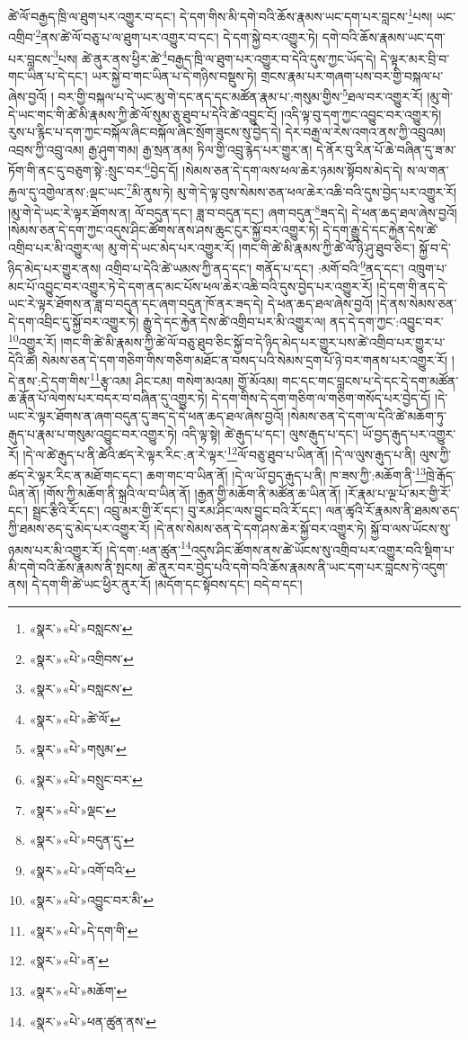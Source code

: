 ཚེ་ལོ་བརྒྱད་ཁྲི་ལ་ཐུག་པར་འགྱུར་བ་དང་། དེ་དག་གིས་མི་དགེ་བའི་ཆོས་རྣམས་ཡང་དག་པར་བླངས་\footnote{«སྣར་»«པེ་»བསླངས་}པས། ཡང་འགྲིབ་\footnote{«སྣར་»«པེ་»འགྲིབས་}ནས་ཚེ་ལོ་བཅུ་པ་ལ་ཐུག་པར་འགྱུར་བ་དང་། དེ་དག་སྐྱེ་བར་འགྱུར་ཏེ། དགེ་བའི་ཆོས་རྣམས་ཡང་དག་པར་བླངས་\footnote{«སྣར་»«པེ་»བསླངས་}པས། ཚེ་ནུར་ནས་ཕྱིར་ཚེ་\footnote{«སྣར་»«པེ་»ཚེ་ལོ་}བརྒྱད་ཁྲི་ལ་ཐུག་པར་འགྱུར་བ་དེའི་དུས་ཀྱང་ཡོད་དེ། དེ་ལྟར་མར་བྲི་བ་གང་ཡིན་པ་དེ་དང་། ཡར་སྐྱེ་བ་གང་ཡིན་པ་དེ་གཉིས་བསྡུས་ཏེ། གྲངས་རྣམ་པར་གཞག་པས་བར་གྱི་བསྐལ་པ་ཞེས་བྱའོ། །
བར་གྱི་བསྐལ་པ་དེ་ཡང་མུ་གེ་དང་ནད་དང་མཚོན་རྣམ་པ་:གསུམ་གྱིས་\footnote{«སྣར་»«པེ་»གསུམ་}ཐལ་བར་འགྱུར་རོ། །མུ་གེ་དེ་ཡང་གང་གི་ཚེ་མི་རྣམས་ཀྱི་ཚེ་ལོ་སུམ་ཅུ་ཐུབ་པ་དེའི་ཚེ་འབྱུང་ངོ། །འདི་ལྟ་བུ་དག་ཀྱང་འབྱུང་བར་འགྱུར་ཏེ། རུས་པ་རྙིང་པ་དག་ཀྱང་བསྐོལ་ཞིང་བསྐོལ་ཞིང་སྲོག་ཟུངས་སུ་བྱེད་དེ། དེར་བརྒྱ་ལ་རེས་འགའ་ནས་ཀྱི་འབྲུའམ། འབྲས་ཀྱི་འབྲུ་འམ། རྒྱ་ཤུག་གམ། རྒྱ་སྲན་ནམ། ཏིལ་གྱི་འབྲུ་རྙེད་པར་གྱུར་ན། དེ་ནོར་བུ་རིན་པོ་ཆེ་བཞིན་དུ་ཟ་མ་ཏོག་གི་ནང་དུ་བཅུག་སྟེ་:སྲུང་བར་\footnote{«སྣར་»«པེ་»བསྲུང་བར་}བྱེད་དོ། །སེམས་ཅན་དེ་དག་ལས་ཕལ་ཆེར་ཉམས་སྟོབས་མེད་དེ། ས་ལ་གན་རྐྱལ་དུ་འགྱེལ་ནས་:ལྡང་ཡང་\footnote{«སྣར་»«པེ་»ལྡང་}མི་ནུས་ཏེ། མུ་གེ་དེ་ལྟ་བུས་སེམས་ཅན་ཕལ་ཆེར་འཆི་བའི་དུས་བྱེད་པར་འགྱུར་རོ། །མུ་གེ་དེ་ཡང་རེ་ལྟར་ཐོགས་ན། ལོ་བདུན་དང་། ཟླ་བ་བདུན་དང་། ཞག་བདུན་\footnote{«སྣར་»«པེ་»བདུན་དུ་}ཟད་དེ། དེ་ཕན་ཆད་ཐལ་ཞེས་བྱའོ། །སེམས་ཅན་དེ་དག་ཀྱང་འདུས་ཤིང་ཚོགས་ནས་ཤས་ཆུང་ངུར་སྐྱོ་བར་འགྱུར་ཏེ། དེ་དག་རྒྱུ་དེ་དང་རྐྱེན་དེས་ཚེ་འགྲིབ་པར་མི་འགྱུར་ལ། མུ་གེ་དེ་ཡང་མེད་པར་འགྱུར་རོ། །གང་གི་ཚེ་མི་རྣམས་ཀྱི་ཚེ་ལོ་ཉི་ཤུ་ཐུབ་ཅིང་། སྐྱོ་བ་དེ་ཉིད་མེད་པར་གྱུར་ནས། འགྲིབ་པ་དེའི་ཚེ་ཡམས་ཀྱི་ནད་དང་། གནོད་པ་དང་། :མགོ་བའི་\footnote{«སྣར་»«པེ་»འགོ་བའི་}ནད་དང་། འཁྲུག་པ་མང་པོ་འབྱུང་བར་འགྱུར་ཏེ་དེ་དག་ནད་མང་པོས་ཕལ་ཆེར་འཆི་བའི་དུས་བྱེད་པར་འགྱུར་རོ། །དེ་དག་གི་ནད་དེ་ཡང་རེ་ལྟར་ཐོགས་ན་ཟླ་བ་བདུན་དང་ཞག་བདུན་ཁོ་ནར་ཟད་དེ། དེ་ཕན་ཆད་ཐལ་ཞེས་བྱའོ། །དེ་ནས་སེམས་ཅན་དེ་དག་འབྲིང་དུ་སྐྱོ་བར་འགྱུར་ཏེ། རྒྱུ་དེ་དང་རྐྱེན་དེས་ཚེ་འགྲིབ་པར་མི་འགྱུར་ལ། ནད་དེ་དག་ཀྱང་:འབྱུང་བར་\footnote{«སྣར་»«པེ་»འབྱུང་བར་མི་}འགྱུར་རོ། །གང་གི་ཚེ་མི་རྣམས་ཀྱི་ཚེ་ལོ་བཅུ་ཐུབ་ཅིང་སྐྱོ་བ་དེ་ཉིད་མེད་པར་གྱུར་པས་ཚེ་འགྲིབ་པར་གྱུར་པ་དེའི་ཚེ། སེམས་ཅན་དེ་དག་གཅིག་གིས་གཅིག་མཐོང་ན་བསད་པའི་སེམས་དྲག་པོ་ཉེ་བར་གནས་པར་འགྱུར་རོ། །དེ་ནས་:དེ་དག་གིས་\footnote{«སྣར་»«པེ་»དེ་དག་གི་}རྩྭ་འམ། ཤིང་ངམ། གསེག་མའམ། གྱོ་མོའམ། གང་དང་གང་བླངས་པ་དེ་དང་དེ་དག་མཚོན་ཆ་རྣོན་པོ་ལེགས་པར་བདར་བ་བཞིན་དུ་འགྱུར་ཏེ། དེ་དག་གིས་དེ་དག་གཅིག་ལ་གཅིག་གསོད་པར་བྱེད་དོ། །དེ་ཡང་རེ་ལྟར་ཐོགས་ན་ཞག་བདུན་དུ་ཟད་དེ་དེ་ཕན་ཆད་ཐལ་ཞེས་བྱའོ། །སེམས་ཅན་དེ་དག་ལ་དེའི་ཚེ་མཆོག་ཏུ་རྒུད་པ་རྣམ་པ་གསུམ་འབྱུང་བར་འགྱུར་ཏེ། འདི་ལྟ་སྟེ། ཚེ་རྒུད་པ་དང་། ལུས་རྒུད་པ་དང་། ཡོ་བྱད་རྒུད་པར་འགྱུར་རོ། །དེ་ལ་ཚེ་རྒུད་པ་ནི་ཚེའི་ཚད་རེ་ལྟར་རིང་:ན་རེ་ལྟར་\footnote{«སྣར་»«པེ་»ན་}ལོ་བཅུ་ཐུབ་པ་ཡིན་ནོ། །དེ་ལ་ལུས་རྒུད་པ་ནི། ལུས་ཀྱི་ཚད་རེ་ལྟར་རིང་ན་མཐོ་གང་དང་། ཆག་གང་བ་ཡིན་ནོ། །དེ་ལ་ཡོ་བྱད་རྒུད་པ་ནི། ཁ་ཟས་ཀྱི་:མཆོག་ནི་\footnote{«སྣར་»«པེ་»མཆོག་}ཁྲེ་རྒོད་ཡིན་ནོ། །གོས་ཀྱི་མཆོག་ནི་སྐྲའི་ལ་བ་ཡིན་ནོ། །རྒྱན་གྱི་མཆོག་ནི་མཚོན་ཆ་ཡིན་ནོ། །རོ་རྣམ་པ་ལྔ་པོ་མར་གྱི་རོ་དང་། སྦྲང་རྩིའི་རོ་དང་། འབྲུ་མར་གྱི་རོ་དང་། བུ་རམ་ཤིང་ལས་བྱུང་བའི་རོ་དང་། ལན་ཚྭའི་རོ་རྣམས་ནི་ཐམས་ཅད་ཀྱི་ཐམས་ཅད་དུ་མེད་པར་འགྱུར་རོ། །དེ་ནས་སེམས་ཅན་དེ་དག་ཤས་ཆེར་སྐྱོ་བར་འགྱུར་ཏེ། སྐྱོ་བ་ལས་ཡོངས་སུ་ཉམས་པར་མི་འགྱུར་རོ། །དེ་དག་:ཕན་ཚུན་\footnote{«སྣར་»«པེ་»ཕན་ཚུན་ནས་}འདུས་ཤིང་ཚོགས་ནས་ཚེ་ཡོངས་སུ་འགྲིབ་པར་འགྱུར་བའི་སྡིག་པ་མི་དགེ་བའི་ཆོས་རྣམས་ནི་སྤངས། ཚེ་ནུར་བར་བྱེད་པའི་དགེ་བའི་ཆོས་རྣམས་ནི་ཡང་དག་པར་བླངས་ཏེ་འདུག་ནས། དེ་དག་གི་ཚེ་ཡང་ཕྱིར་ནུར་རོ། །མདོག་དང་སྟོབས་དང་། བདེ་བ་དང་། 